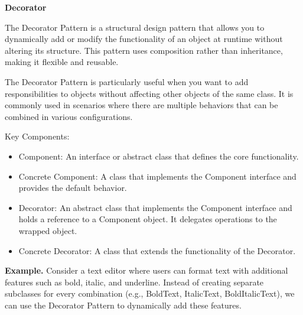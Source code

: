 \medskip
\begin{center}
\textbf{Decorator}
\end{center}

The Decorator Pattern is a structural design pattern that allows you to dynamically add or modify the functionality of an object at runtime without altering its structure. This pattern uses composition rather than inheritance, making it flexible and reusable.

The Decorator Pattern is particularly useful when you want to add responsibilities to objects without affecting other objects of the same class. It is commonly used in scenarios where there are multiple behaviors that can be combined in various configurations.

Key Components:

\begin{itemize}
\item Component: An interface or abstract class that defines the core functionality.

\item Concrete Component: A class that implements the Component interface and provides the default behavior.

\item Decorator: An abstract class that implements the Component interface and holds a reference to a Component object. It delegates operations to the wrapped object.

\item Concrete Decorator: A class that extends the functionality of the Decorator.

\end{itemize}

\textbf{Example.} Consider a text editor where users can format text with additional features such as bold, italic, and underline. Instead of creating separate subclasses for every combination (e.g., BoldText, ItalicText, BoldItalicText), we can use the Decorator Pattern to dynamically add these features.


